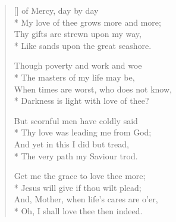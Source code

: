 \newHymn
{}
\begin{verse}[\versewidth]
 of Mercy, day by day \\*
My love of thee grows more and more; \\
Thy gifts are strewn upon my way, \\*
Like sands upon the great seashore. 

Though poverty and work and woe \\*
The masters of my life may be, \\
When times are worst, who does not know, \\*
Darkness is light with love of thee? 

But scornful men have coldly said \\*
Thy love was leading me from God; \\
And yet in this I did but tread, \\*
The very path my Saviour trod. 

Get me the grace to love thee more; \\*
Jesus will give if thou wilt plead; \\
And, Mother, when life's cares are o'er, \\*
Oh, I shall love thee then indeed. 

\end{verse}


